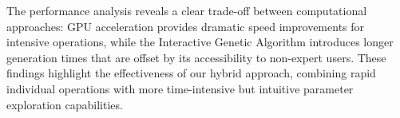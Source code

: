 The performance analysis reveals a clear trade-off between computational approaches: GPU acceleration provides dramatic speed improvements for intensive operations, while the Interactive Genetic Algorithm introduces longer generation times that are offset by its accessibility to non-expert users. These findings highlight the effectiveness of our hybrid approach, combining rapid individual operations with more time-intensive but intuitive parameter exploration capabilities.




















